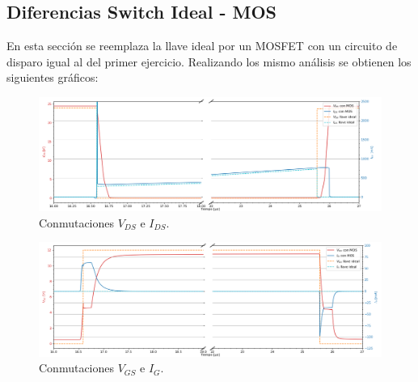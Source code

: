 %

%

\subsection{Diferencias Switch Ideal - MOS}
En esta sección se reemplaza la llave ideal por un MOSFET con un circuito de disparo igual al del primer ejercicio. Realizando los mismo análisis se obtienen los siguientes gráficos:

\begin{multicols}{2}
\begin{figure}[H]
	\centering
	\includegraphics[width=\linewidth]{ImagenesEjercicio-3/ids-vds-2v3}
	\caption{Conmutaciones $V_{DS}$ e  $I_{DS}$.}
	\label{fig:ej3:conmutacionON_OFF_VDS_IDS}
\end{figure}
\begin{figure}[H]
	\centering
	\includegraphics[width=\linewidth]{ImagenesEjercicio-3/ig-vgs-2v3}
	\caption{Conmutaciones $V_{GS}$ e  $I_{G}$.}
	\label{fig:ej3:conmutacionON_OFF_VGS_IG}
\end{figure}
\end{multicols}
